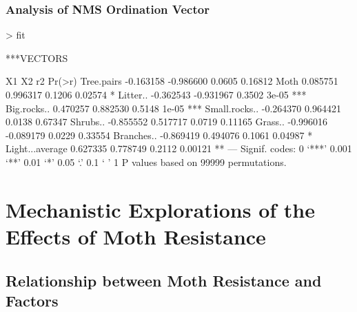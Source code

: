\documentclass[a4paper]{article}
\begin{document}
\subsubsection{Analysis of NMS Ordination Vector}
\begin{Schunk}
\begin{Sinput}
> fit
\end{Sinput}
\begin{Soutput}
***VECTORS

                       X1        X2     r2  Pr(>r)    
Tree.pairs      -0.163158 -0.986600 0.0605 0.16812    
Moth             0.085751  0.996317 0.1206 0.02574 *  
Litter..        -0.362543 -0.931967 0.3502   3e-05 ***
Big.rocks..      0.470257  0.882530 0.5148   1e-05 ***
Small.rocks..   -0.264370  0.964421 0.0138 0.67347    
Shrubs..        -0.855552  0.517717 0.0719 0.11165    
Grass..         -0.996016 -0.089179 0.0229 0.33554    
Branches..      -0.869419  0.494076 0.1061 0.04987 *  
Light...average  0.627335  0.778749 0.2112 0.00121 ** 
---
Signif. codes:  0 ‘***’ 0.001 ‘**’ 0.01 ‘*’ 0.05 ‘.’ 0.1 ‘ ’ 1 
P values based on 99999 permutations.
\end{Soutput}
\end{Schunk}

\section{Mechanistic Explorations of the Effects of Moth Resistance}

\subsection{Relationship between Moth Resistance and Factors}
\end{document}
